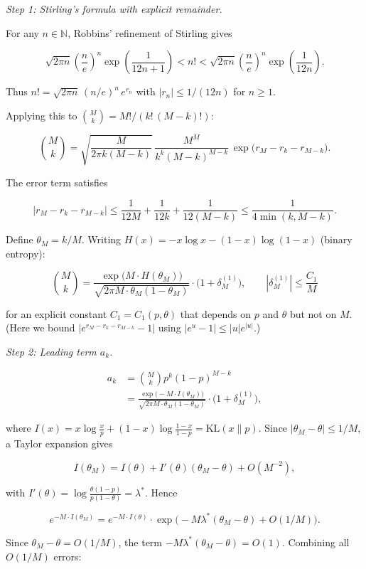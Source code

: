 \documentclass[
  12pt,
]{article}
\begin{document}
\emph{Step 1: Stirling's formula with explicit remainder.}

For any \(n \in \mathbb{N}\), Robbins' refinement of Stirling gives

\[\sqrt{2\pi n}\left(\frac{n}{e}\right)^n \exp\!\left(\frac{1}{12n+1}\right) < n! < \sqrt{2\pi n}\left(\frac{n}{e}\right)^n \exp\!\left(\frac{1}{12n}\right).\]

Thus \(n! = \sqrt{2\pi n}\,(n/e)^n\,e^{r_n}\) with
\(|r_n| \leq 1/(12n)\) for \(n \geq 1\).

Applying this to \(\binom{M}{k} = M!/(k!\,(M-k)!)\):

\[
\binom{M}{k} = \sqrt{\frac{M}{2\pi k(M-k)}}\,
\frac{M^M}{k^k (M-k)^{M-k}}\,
\exp\!\big(r_M - r_k - r_{M-k}\big).
\]

The error term satisfies

\[|r_M - r_k - r_{M-k}| \leq \frac{1}{12M} + \frac{1}{12k} + \frac{1}{12(M-k)}
\leq \frac{1}{4\min(k, M-k)}.\]

Define \(\theta_M = k/M\). Writing \(H(x) = -x\log x - (1-x)\log(1-x)\)
(binary entropy):

\[\binom{M}{k} = \frac{\exp\!\big(M\cdot H(\theta_M)\big)}{\sqrt{2\pi M\cdot\theta_M(1-\theta_M)}}
\cdot \big(1 + \delta_M^{(1)}\big), \qquad |\delta_M^{(1)}| \leq \frac{C_1}{M}\]

for an explicit constant \(C_1 = C_1(p,\theta)\) that depends on \(p\)
and \(\theta\) but not on \(M\). (Here we bound
\(|e^{r_M-r_k-r_{M-k}} - 1|\) using \(|e^u-1| \leq |u|e^{|u|}\).)

\emph{Step 2: Leading term \(a_k\).}

\[
\begin{aligned}
a_k &= \binom{M}{k} p^k (1-p)^{M-k} \\
&= \frac{\exp\!\big(-M\cdot I(\theta_M)\big)}{\sqrt{2\pi M\cdot\theta_M(1-\theta_M)}}
\cdot \big(1 + \delta_M^{(1)}\big),
\end{aligned}
\]

where
\(I(x) = x\log\frac{x}{p} + (1-x)\log\frac{1-x}{1-p} = \text{KL}(x\|p)\).
Since \(|\theta_M - \theta| \leq 1/M\), a Taylor expansion gives

\[I(\theta_M) = I(\theta) + I'(\theta)(\theta_M-\theta) + O(M^{-2}),\]

with \(I'(\theta) = \log\frac{\theta(1-p)}{p(1-\theta)} = \lambda^*\).
Hence

\[e^{-M\cdot I(\theta_M)} = e^{-M\cdot I(\theta)} \cdot \exp\!\big(-M\lambda^*(\theta_M-\theta) + O(1/M)\big).\]

Since \(\theta_M - \theta = O(1/M)\), the term
\(-M\lambda^*(\theta_M-\theta) = O(1)\). Combining all \(O(1/M)\)
errors:
\end{document}

